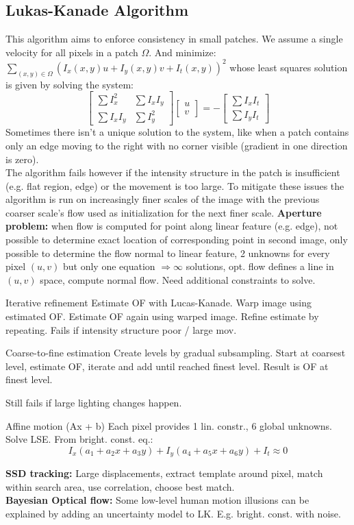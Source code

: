 \documentclass[a4paper,9pt]{article}
\begin{document}
\subsection{Lukas-Kanade Algorithm}
This algorithm aims to enforce consistency in small patches. 
We assume a single velocity for all pixels in a patch $\Omega$. And minimize:
$\sum_{(x,y)\in \Omega}(I_x(x,y)u+I_y(x,y)v+I_t(x,y))^2$ whose least squares solution is given by solving the system:
$$
\begin{bmatrix}
\sum I_x^2 & \sum I_x I_y \\
\sum I_x I_y & \sum I_y^2
\end{bmatrix}
\begin{bmatrix}
u \\
v
\end{bmatrix}
= -
\begin{bmatrix}
\sum I_x I_t \\
\sum I_y I_t
\end{bmatrix}
$$
Sometimes there isn't a unique solution to the system, like when a patch contains only an edge moving to the right with no corner visible (gradient in one direction is zero).\\
The algorithm fails however if the intensity structure in the patch is insufficient (e.g. flat region, edge) or the movement is too large.
To mitigate these issues the algorithm is run on increasingly finer scales of the image with the previous coarser scale's flow used as initialization for the next finer scale. 
\textbf{Aperture problem:} when flow is computed for point along linear feature (e.g. edge), not possible to determine exact location of corresponding point in second image, only possible to determine the flow normal to linear feature, 2 unknowns for every pixel $(u, v)$ but only one equation $\Rightarrow \infty$ solutions, opt. flow defines a line in $(u, v)$ space, compute normal flow. Need additional constraints to solve.
\begin{subbox}{Iterative refinement}
Estimate OF with Lucas-Kanade. Warp image using estimated OF. Estimate OF again using warped image. Refine estimate by repeating. Fails if intensity structure poor / large mov.
\end{subbox}
\begin{subbox}{Coarse-to-fine estimation}
Create levels by gradual subsampling. Start at coarsest level, estimate OF, iterate and add until reached finest level. Result is OF at finest level.
\end{subbox}
Still fails if large lighting changes happen.
\begin{subbox}{Affine motion (Ax + b)}
Each pixel provides 1 lin. constr., 6 global unknowns. Solve LSE. From bright. const. eq.:
$$ I_x (a_1 + a_2 x + a_3 y) + I_y (a_4 + a_5 x + a_6 y) + I_t \approx 0 $$
\end{subbox}
\textbf{SSD tracking:} Large displacements, extract template around pixel, match within search area, use correlation, choose best match.\\
\textbf{Bayesian Optical flow:} Some low-level human motion illusions can be explained by adding an uncertainty model to LK. E.g. bright. const. with noise.
\end{document}

